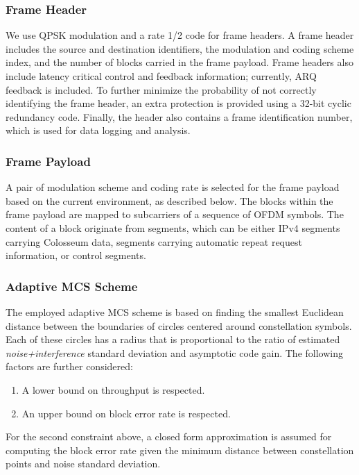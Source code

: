 \documentclass[11pt]{article}
\begin{document}
\subsubsection{Frame Header}
We use QPSK modulation and a rate 1/2 code for frame headers. A frame header includes the source and destination identifiers, the modulation and coding scheme index, and the number of blocks carried in the frame payload.  Frame headers also include latency critical control and feedback information; currently, ARQ feedback is included. To further minimize the probability of not correctly identifying the frame header, an extra protection is provided using a 32-bit cyclic redundancy code. Finally, the header also contains a frame identification number, which is used for data logging and analysis.

\subsubsection{Frame Payload}
A pair of modulation scheme and coding rate is selected for the frame payload based on the current environment, as described below. The blocks within the frame payload are mapped to subcarriers of a sequence of OFDM symbols. The content of a block originate from segments, which can be either IPv4 segments carrying Colosseum data,  segments carrying automatic repeat request information, or control segments.

\subsubsection{Adaptive MCS Scheme}
The employed adaptive MCS scheme is based on finding the smallest Euclidean distance between the boundaries of circles centered around constellation symbols. Each of these circles has a radius that is proportional to the ratio of estimated \emph{noise+interference} standard deviation and asymptotic code gain. The following factors are further considered:
\begin{enumerate}
    \item A lower bound on throughput is respected.
    \item An upper bound on block error rate is respected.
\end{enumerate}
For the second constraint above, a closed form approximation is assumed for computing the block error rate given the minimum distance between constellation points and noise standard deviation. 
\end{document}
